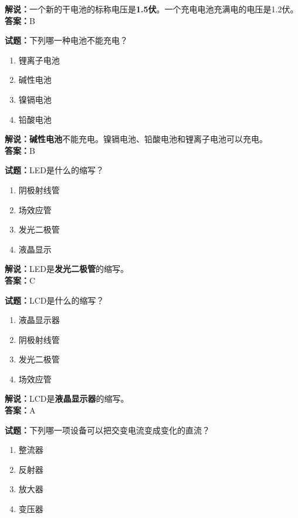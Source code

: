 \documentclass{ctexbook}
\begin{document}
\noindent\textbf{解说：}一个新的干电池的标称电压是\textbf{1.5伏}。一个充电电池充满电的电压是1.2伏。\\\noindent\textbf{答案：}B

\bigskip


\noindent\textbf{试题：}下列哪一种电池不能充电？

\begin{enumerate}[leftmargin=3em]
	\item 锂离子电池
	\item 碱性电池
	\item 镍镉电池
	\item 铅酸电池
\end{enumerate}

\noindent\textbf{解说：碱性电池}不能充电。镍镉电池、铅酸电池和锂离子电池可以充电。\\\noindent\textbf{答案：}B
\bigskip


\noindent\textbf{试题：}LED是什么的缩写？

\begin{enumerate}[leftmargin=3em]
	\item 阴极射线管
	\item 场效应管
	\item 发光二极管
	\item 液晶显示
\end{enumerate}

\noindent\textbf{解说：}LED是\textbf{发光二极管}的缩写。\\\noindent\textbf{答案：}C

\bigskip


\noindent\textbf{试题：}LCD是什么的缩写？

\begin{enumerate}[leftmargin=3em]
	\item 液晶显示器
	\item 阴极射线管
	\item 发光二极管
	\item 场效应管
\end{enumerate}

\noindent\textbf{解说：}LCD是\textbf{液晶显示器}的缩写。\\\noindent\textbf{答案：}A

\bigskip


\noindent\textbf{试题：}下列哪一项设备可以把交变电流变成变化的直流？

\begin{enumerate}[leftmargin=3em]
	\item 整流器
	\item 反射器
	\item 放大器
	\item 变压器
\end{enumerate}
\end{document}

